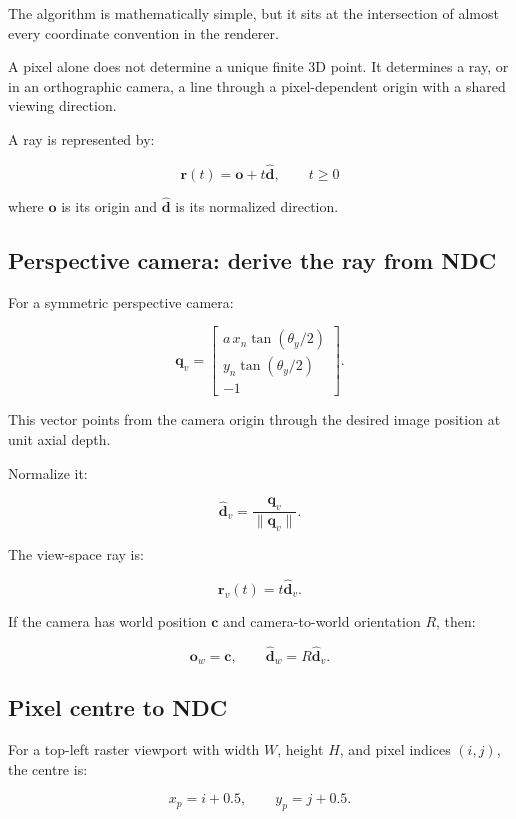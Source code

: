 The algorithm is mathematically simple, but it sits at the intersection of almost every coordinate convention in the renderer.

A pixel alone does not determine a unique finite 3D point. It determines a ray, or in an orthographic camera, a line through a pixel-dependent origin with a shared viewing direction.

A ray is represented by:

\[ \boxed{ \mathbf r(t)=\mathbf o+t\hat{\mathbf d}, \qquad t\ge0 } \]

where \(\mathbf o\) is its origin and \(\hat{\mathbf d}\) is its normalized direction.

\subsection{Perspective camera: derive the ray from NDC}\label{02-foundations-ii-ch035-perspective-camera-derive-the-ray-from-ndc}

For a symmetric perspective camera:

\[ \mathbf q_v= \begin{bmatrix} a\,x_n\tan(\theta_y/2)\\ y_n\tan(\theta_y/2)\\ -1 \end{bmatrix}. \]

This vector points from the camera origin through the desired image position at unit axial depth.

Normalize it:

\[ \boxed{ \hat{\mathbf d}_v= \frac{\mathbf q_v}{\|\mathbf q_v\|}. } \]

The view-space ray is:

\[ \boxed{ \mathbf r_v(t)=t\hat{\mathbf d}_v. } \]

If the camera has world position \(\mathbf c\) and camera-to-world orientation \(R\), then:

\[ \boxed{ \mathbf o_w=\mathbf c, \qquad \hat{\mathbf d}_w=R\hat{\mathbf d}_v. } \]

\subsection{Pixel centre to NDC}\label{02-foundations-ii-ch035-pixel-centre-to-ndc}

For a top-left raster viewport with width \(W\), height \(H\), and pixel indices \((i,j)\), the centre is:

\[ x_p=i+0.5, \qquad y_p=j+0.5. \]

